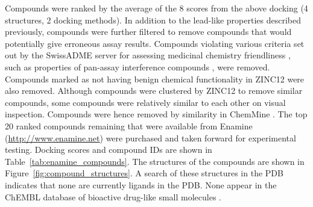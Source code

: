 Compounds were ranked by the average of the 8 scores from the above docking (4 structures, 2 docking methods).
In addition to the lead-like properties described previously, compounds were further filtered to remove compounds that would potentially give erroneous assay results.
Compounds violating various criteria set out by the SwissADME server for assessing medicinal chemistry friendliness \cite{Daina2017}, such as properties of pan-assay interference compounds \cite{Baell2014}, were removed.
Compounds marked as not having benign chemical functionality in ZINC12 were also removed.
Although compounds were clustered by ZINC12 to remove similar compounds, some compounds were relatively similar to each other on visual inspection.
Compounds were hence removed by similarity in ChemMine \cite{Backman2011}.
The top 20 ranked compounds remaining that were available from Enamine (\url{http://www.enamine.net}) were purchased and taken forward for experimental testing.
Docking scores and compound IDs are shown in Table~\ref{tab:enamine_compounds}.
The structures of the compounds are shown in Figure~\ref{fig:compound_structures}.
A search of these structures in the PDB indicates that none are currently ligands in the PDB.
None appear in the ChEMBL database of bioactive drug-like small molecules \cite{Gaulton2017}.


